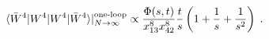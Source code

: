 \begin{equation}\label{8'''}
  \langle \bar W^4| W^4|W^4|\bar W^4 \rangle|^{\scriptsize\mbox{one-loop}}_{N \to \infty} \propto  \frac{\Phi(s,t)}{x^8_{13}x^8_{42}} \frac{t}{s}\left(1 + \frac{1}{s} + \frac{1}{s^2} \right)\; . \end{equation}

